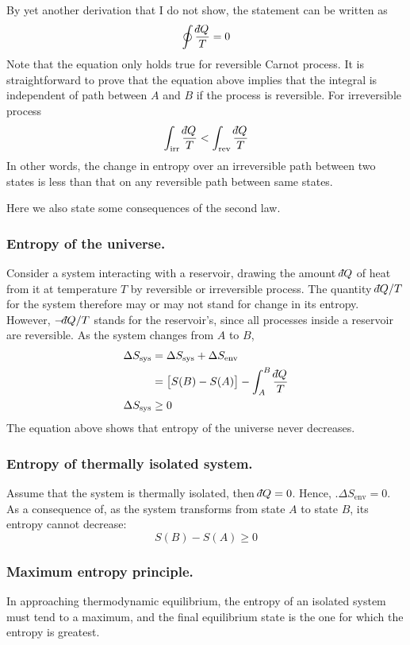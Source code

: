 \documentclass[../../../Main.tex]{subfiles}
\begin{document}
By yet another derivation that I do not show, the statement can be written as 
\begin{equation*}
    \oint\frac{\dbar Q}{T}=0
\end{equation*}
Note that the equation only holds true for reversible Carnot process. It is straightforward to prove that the equation above implies that the integral is independent of path between $A$ and $B$ if the process is reversible. For irreversible process
\begin{equation*}
    \int_{\text{irr}}\frac{\dbar Q}{T}<\int_{\text{rev}}\frac{\dbar Q}{T}
\end{equation*}
In other words, the change in entropy over an irreversible path between two states is less than that on any reversible path between same states.

Here we also state some consequences of the second law.

\subsubsection*{Entropy of the universe.} Consider a system interacting with a reservoir, drawing the amount $\dbar Q$ of heat from it at temperature $T$ by reversible or irreversible process. The quantity $\dbar Q/T$ for the system therefore may or may not stand for change in its entropy. However, $-\dbar Q /T$ stands for the reservoir's, since all processes inside a reservoir are reversible. As the system changes from $A$ to $B$,
\begin{align*}
    \Delta S_{\text{sys}} &=\Delta S_{\text{sys}}+\Delta S_{\text{env}}\\
    &=\big[S(B)-S{(A)}\big]-\int_A^B\frac{\dbar Q}{T}\\
    \Delta S_{\text{sys}} &\geq0
\end{align*}
The equation above shows that entropy of the universe never decreases.

\subsubsection*{Entropy of thermally isolated system.} Assume that the system is thermally isolated, then $\dbar Q = 0$. Hence, $.\Delta S_{\text{env}}=0$. As a consequence of, as the system transforms from state $A$ to state $B$, its entropy cannot decrease:
\begin{equation*}
    S(B)-S(A)\geq0
\end{equation*}

\subsubsection*{Maximum entropy principle.} In approaching thermodynamic equilibrium, the entropy of an isolated system must tend to a maximum, and the final equilibrium state is the one for which the entropy is greatest.
\end{document}
